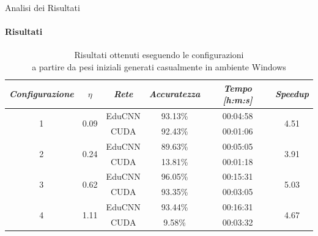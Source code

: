 \documentclass[
 ]{beamer}
\begin{document}
\begin{frame}{Analisi dei Risultati}
    \framesubtitle{Risultati}

           \begin{table}
            \centering
            \renewcommand\arraystretch{1.3}
            \small
            \begin{tabular}{| c | c | c | c | c | c |}
                \hline
                \emph{Configurazione} & $\eta$ & \emph{Rete} & \emph{Accuratezza} & \emph{Tempo [h:m:s]} & \emph{Speedup} \\
                \hline
                \multirow{2}{*}{1} & \multirow{2}{*}{0.09} & EduCNN & 93.13\% & 00:04:58 & \multirow{2}{*}{4.51} \\ \cline{3-5} 
                                   &                       & CUDA   & 92.43\% & 00:01:06 & \\
                \hline
                \multirow{2}{*}{2} & \multirow{2}{*}{0.24} & EduCNN & 89.63\% & 00:05:05 & \multirow{2}{*}{3.91} \\ \cline{3-5} 
                                   &                       & CUDA   & 13.81\% & 00:01:18  & \\
                \hline
                \multirow{2}{*}{3} & \multirow{2}{*}{0.62} & EduCNN & 96.05\% & 00:15:31 & \multirow{2}{*}{5.03} \\ \cline{3-5} 
                                   &                       & CUDA   & 93.35\% & 00:03:05 & \\
                \hline
                \multirow{2}{*}{4} & \multirow{2}{*}{1.11} & EduCNN & 93.44\% & 00:16:31 & \multirow{2}{*}{4.67} \\ \cline{3-5} 
                                   &                       & CUDA   & 9.58\%  & 00:03:32  & \\
                \hline
            \end{tabular}
            \caption                        
    {Risultati ottenuti eseguendo le configurazioni \\ a partire da pesi iniziali generati casualmente in ambiente Windows \endtabular}          
        \end{table}    
\end{frame}
\end{document}
